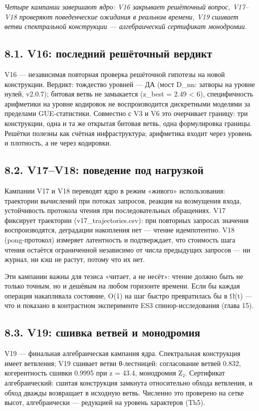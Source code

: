 \documentclass[11pt,a4paper]{article}
\begin{document}
\noindent\textit{\color{copper}Четыре кампании завершают ядро: V16 закрывает решёточный вопрос, V17–V18 проверяют поведенческие ожидания в реальном времени, V19 сшивает ветви спектральной конструкции — алгебраический сертификат монодромии.}

\subsection{8.1. V16: последний решёточный вердикт}

V16 — независимая повторная проверка решёточной гипотезы на новой конструкции. Вердикт: тождество уровней — ДА (мост D\_nn: затворы на уровне нулей, v2.0.7); битовая ветвь не замыкается (z\_best = 2.49 < 6), специфичность арифметики на уровне кодировок не воспроизводится дискретными моделями за пределами GUE-статистики. Совместно с V3 и V6 это очерчивает границу: три конструкции, одна и та же открытая битовая ветвь, одна формулировка границы. Решётки полезны как счётная инфраструктура; арифметика входит через уровень и плотность, а не через кодировки.

\subsection{8.2. V17–V18: поведение под нагрузкой}

Кампании V17 и V18 переводят ядро в режим «живого» использования: траектории вычислений при потоках запросов, реакция на возмущения входа, устойчивость протокола чтения при последовательных обращениях. V17 фиксирует траектории (v17\_trajectories.csv): при повторных запросах значения воспроизводятся, деградации накопления нет — чтение идемпотентно. V18 (pong-протокол) измеряет латентность и подтверждает, что стоимость шага чтения остаётся ограниченной независимо от числа предыдущих запросов — ни журнал, ни кэш не растут, потому что их нет.

Эти кампании важны для тезиса «читает, а не несёт»: чтение должно быть не только точным, но и дешёвым на любом горизонте времени. Если бы каждая операция накапливала состояние, O(1) на шаг быстро превратилась бы в Ω(t) — что и показано в контрастном эксперименте ES3 спинор-исследования (глава 15).

\subsection{8.3. V19: сшивка ветвей и монодромия}

V19 — финальная алгебраическая кампания ядра. Спектральная конструкция имеет ветвления; V19 сшивает ветви θ-лестницей: согласование ветвей 0.832, когерентность сшивки 0.9995 при z = 43.4, монодромия Z₂. Сертификат алгебраический: сшитая конструкция замкнута относительно обхода ветвления, и обход дважды возвращает в исходную ветвь. Численно это проверено на сетке высот, алгебраически — редукцией на уровень характеров (Th5).
\end{document}
